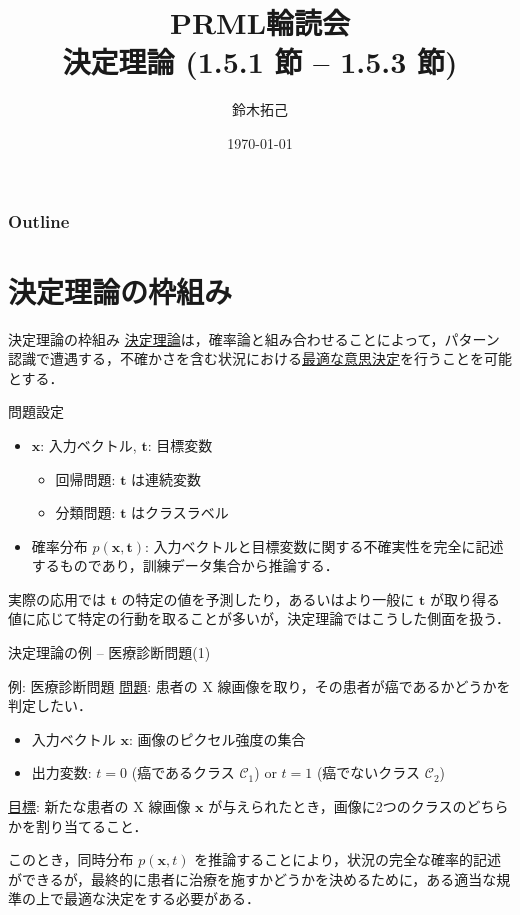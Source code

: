 \documentclass[uplatex,11pt,dvipdfmx,aspectratio=169,unicode,t]{beamer}
\title{PRML輪読会\\決定理論 (1.5.1 節 -- 1.5.3 節)}
\author{鈴木拓己}
\institute{}
\date{\today}
\numberwithin{equation}{section}
\newcommand{\CC}{\mathcal{C}}
\newcommand{\bs}[1]{\boldsymbol{#1}}
\newcommand{\1}{\bs{1}}
\newcommand{\0}{\bs{0}}
\begin{document}
\begin{frame}[plain]
    \titlepage
\end{frame}

\begin{frame}\frametitle{Outline}
    \tableofcontents
\end{frame}

\section{決定理論の枠組み}

\begin{frame}{決定理論の枠組み}
    \underline{決定理論}は，確率論と組み合わせることによって，パターン認識で遭遇する，不確かさを含む状況における\underline{最適な意思決定}を行うことを可能とする．
    \begin{block}{問題設定}
        \begin{itemize}
        \item $\bs{x}$: 入力ベクトル, $\bs{t}$: 目標変数
        \begin{itemize}
            \item 回帰問題: $\bs{t}$ は連続変数
            \item 分類問題: $\bs{t}$ はクラスラベル
        \end{itemize}
        \item 確率分布 $p(\bs{x},\bs{t})$: 入力ベクトルと目標変数に関する不確実性を完全に記述するものであり，訓練データ集合から推論する．
    \end{itemize}
    \end{block}
    実際の応用では $\bs{t}$ の特定の値を予測したり，あるいはより一般に $\bs{t}$ が取り得る値に応じて特定の行動を取ることが多いが，決定理論ではこうした側面を扱う．
\end{frame}

\begin{frame}{決定理論の例 -- 医療診断問題(1)}
    \begin{block}{例: 医療診断問題}
        \underline{問題}: 患者の X 線画像を取り，その患者が癌であるかどうかを判定したい．
        \begin{itemize}
            \item 入力ベクトル $\bs{x}$: 画像のピクセル強度の集合
            \item 出力変数: $t=0$ (癌であるクラス $\CC_{1}$) or $t=1$ (癌でないクラス $\CC_{2}$)
        \end{itemize}
        \underline{目標}: 新たな患者の X 線画像 $\bs{x}$ が与えられたとき，画像に2つのクラスのどちらかを割り当てること．
    \end{block}
    このとき，同時分布 $p(\bs{x},t)$ を推論することにより，状況の完全な確率的記述ができるが，最終的に患者に治療を施すかどうかを決めるために，ある適当な規準の上で最適な決定をする必要がある．
\end{frame}
\end{document}
